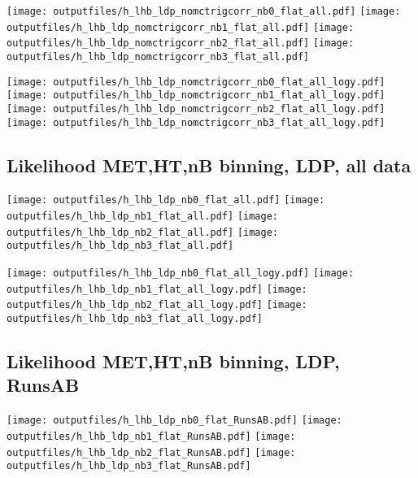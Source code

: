 \documentclass[11pt]{article}
\begin{document}
    \noindent
     \texttt{[image: outputfiles/h\_lhb\_ldp\_nomctrigcorr\_nb0\_flat\_all.pdf]}
     \texttt{[image: outputfiles/h\_lhb\_ldp\_nomctrigcorr\_nb1\_flat\_all.pdf]}
     \texttt{[image: outputfiles/h\_lhb\_ldp\_nomctrigcorr\_nb2\_flat\_all.pdf]}
     \texttt{[image: outputfiles/h\_lhb\_ldp\_nomctrigcorr\_nb3\_flat\_all.pdf]}

    \noindent
     \texttt{[image: outputfiles/h\_lhb\_ldp\_nomctrigcorr\_nb0\_flat\_all\_logy.pdf]}
     \texttt{[image: outputfiles/h\_lhb\_ldp\_nomctrigcorr\_nb1\_flat\_all\_logy.pdf]}
     \texttt{[image: outputfiles/h\_lhb\_ldp\_nomctrigcorr\_nb2\_flat\_all\_logy.pdf]}
     \texttt{[image: outputfiles/h\_lhb\_ldp\_nomctrigcorr\_nb3\_flat\_all\_logy.pdf]}

   \clearpage

    \subsection{ Likelihood MET,HT,nB binning, LDP, all data}

    \noindent
     \texttt{[image: outputfiles/h\_lhb\_ldp\_nb0\_flat\_all.pdf]}
     \texttt{[image: outputfiles/h\_lhb\_ldp\_nb1\_flat\_all.pdf]}
     \texttt{[image: outputfiles/h\_lhb\_ldp\_nb2\_flat\_all.pdf]}
     \texttt{[image: outputfiles/h\_lhb\_ldp\_nb3\_flat\_all.pdf]}

    \noindent
     \texttt{[image: outputfiles/h\_lhb\_ldp\_nb0\_flat\_all\_logy.pdf]}
     \texttt{[image: outputfiles/h\_lhb\_ldp\_nb1\_flat\_all\_logy.pdf]}
     \texttt{[image: outputfiles/h\_lhb\_ldp\_nb2\_flat\_all\_logy.pdf]}
     \texttt{[image: outputfiles/h\_lhb\_ldp\_nb3\_flat\_all\_logy.pdf]}

   \clearpage

    \subsection{ Likelihood MET,HT,nB binning, LDP, RunsAB}

    \noindent
     \texttt{[image: outputfiles/h\_lhb\_ldp\_nb0\_flat\_RunsAB.pdf]}
     \texttt{[image: outputfiles/h\_lhb\_ldp\_nb1\_flat\_RunsAB.pdf]}
     \texttt{[image: outputfiles/h\_lhb\_ldp\_nb2\_flat\_RunsAB.pdf]}
     \texttt{[image: outputfiles/h\_lhb\_ldp\_nb3\_flat\_RunsAB.pdf]}
\end{document}
